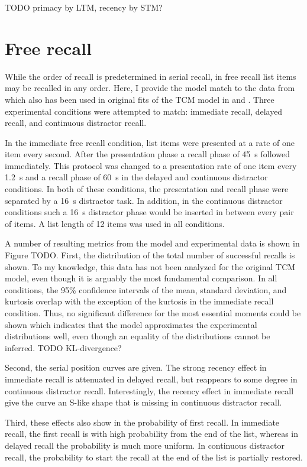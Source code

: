 TODO primacy by LTM, recency by STM\@?


\section{Free recall}
While the order of recall is predetermined in serial recall, in free recall list items may be recalled in any order.
Here, I provide the model match to the data from \textcite{Howard1999} which also has been used in original fits of the TCM model in \textcite{Howard2002} and \textcite{Sederberg2008}.
Three experimental conditions were attempted to match: immediate recall, delayed recall, and continuous distractor recall.

In the immediate free recall condition, list items were presented at a rate of one item every second.
After the presentation phase a recall phase of \SI{45}{\second} followed immediately.
This protocol was changed to a presentation rate of one item every \SI{1.2}{\second} and a recall phase of \SI{60}{\second} in the delayed and continuous distractor conditions.
In both of these conditions, the presentation and recall phase were separated by a \SI{16}{\second} distractor task.
In addition, in the continuous distractor conditions such a \SI{16}{\second} distractor phase would be inserted in between every pair of items.
A list length of 12 items was used in all conditions.

A number of resulting metrics from the model and experimental data is shown in Figure TODO\@.
First, the distribution of the total number of successful recalls is shown.
To my knowledge, this data has not been analyzed for the original TCM model, even though it is arguably the most fundamental comparison.
In all conditions, the 95\% confidence intervals of the mean, standard deviation, and kurtosis overlap with the exception of the kurtosis in the immediate recall condition.
Thus, no significant difference for the most essential moments could be shown which indicates that the model approximates the experimental distributions well, even though an equality of the distributions cannot be inferred.
TODO KL-divergence?

Second, the serial position curves are given.
The strong recency effect in immediate recall is attenuated in delayed recall, but reappears to some degree in continuous distractor recall.
Interestingly, the recency effect in immediate recall give the curve an S-like shape that is missing in continuous distractor recall.

Third, these effects also show in the probability of first recall.
In immediate recall, the first recall is with high probability from the end of the list, whereas in delayed recall the probability is much more uniform.
In continuous distractor recall, the probability to start the recall at the end of the list is partially restored.

